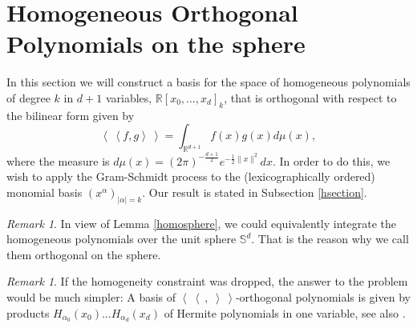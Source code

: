 \documentclass{amsart}
\newcommand{\bra}{\left<\!\!\!\:\left<}
\newcommand{\ket}{\right>\!\!\!\:\right>}
\newcommand{\R}{\mathbb{R}}
\renewcommand{\S}{\mathbb{S}}
\theoremstyle{plain}
\theoremstyle{definition}
\theoremstyle{remark}
\newtheorem{remark}[theorem]{Remark}
\begin{document}
\section{Homogeneous Orthogonal Polynomials on the sphere}
In this section we will construct a basis for the space of homogeneous polynomials of degree $k$ in $d+1$ variables, $\R[x_0,\ldots,x_d]_k$, that is orthogonal with respect to the bilinear form given by
\begin{equation*}
 \bra f,g\ket = \int_{\R^{d+1}}f(x)g(x) d\mu(x),
\end{equation*}
where the measure is $d\mu(x) = (2\pi)^{-\frac{d+1}{2}}e^{-\frac{1}{2}\|x\|^2}dx$. In order to do this, we wish to apply the Gram-Schmidt process to the (lexicographically ordered) monomial basis $(x^\alpha)_{|\alpha |=k}$. Our result is stated in Subsection \ref{hsection}. 
\begin{remark}
In view of Lemma \ref{homosphere}, we could equivalently integrate the homogeneous polynomials over the unit sphere $\S^d$. That is the reason why we call them orthogonal on the sphere.
\end{remark}
\begin{remark}
 If the homogeneity constraint was dropped, the answer to the problem would be much simpler: A basis of $ \bra\ ,\;\ket$-orthogonal polynomials is given by products $H_{\alpha_0}\!(x_0)\ldots H_{\alpha_d}\!(x_d)$ of Hermite polynomials in one variable, see also \cite[Sect.~2.3.4]{Dunkl}.
\end{remark}
\end{document}
